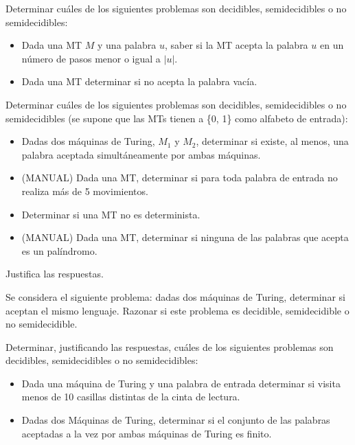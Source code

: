 
\begin{ejercicio}
    Determinar cuáles de los siguientes problemas son decidibles, semidecidibles o no semidecidibles:
    \begin{itemize}
        \item[a)] Dada una MT $M$ y una palabra $u$, saber si la MT acepta la palabra $u$ en un número de pasos menor o igual a $|u|$.
        \item[b)] Dada una MT determinar si no acepta la palabra vacía.
    \end{itemize}
\end{ejercicio}


\begin{ejercicio}
    Determinar cuáles de los siguientes problemas son decidibles, semidecidibles o no semidecidibles 
    (se supone que las MTs tienen a \{0, 1\} como alfabeto de entrada):
    \begin{itemize}
        \item[a)] Dadas dos máquinas de Turing, $M_1$ y $M_2$, determinar si existe, al menos, una palabra
        aceptada simultáneamente por ambas máquinas.
        \item[b)] (MANUAL) Dada una MT, determinar si para toda palabra de entrada no realiza más de 5 movimientos.
        \item[c)] Determinar si una MT no es determinista.
        \item[d)] (MANUAL) Dada una MT, determinar si ninguna de las palabras que acepta es un palíndromo.
    \end{itemize}
    Justifica las respuestas.
\end{ejercicio}


\begin{ejercicio}
    Se considera el siguiente problema: dadas dos máquinas de Turing, determinar si aceptan el mismo lenguaje. 
    Razonar si este problema es decidible, semidecidible o no semidecidible.
\end{ejercicio}


\begin{ejercicio}
    Determinar, justificando las respuestas, cuáles de los siguientes problemas son decidibles, semidecidibles o no semidecidibles:
    \begin{itemize}
        \item[a)] Dada una máquina de Turing y una palabra de entrada determinar si visita menos de 10 casillas distintas de la cinta de lectura. %
        \item[b)] Dadas dos Máquinas de Turing, determinar si el conjunto de las palabras aceptadas a la vez por ambas máquinas de Turing es finito. %
    \end{itemize}
\end{ejercicio}

